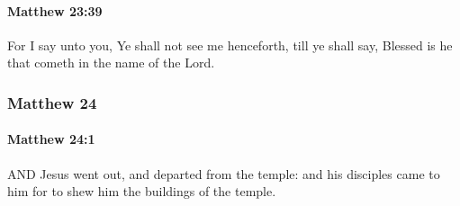 		\paragraph{Matthew 23:39} %
			\label{MATTHEW-23-39}

			For I say unto you, Ye shall not see me henceforth, till ye shall say, Blessed is he that cometh in the name of the Lord.

			\begin{framed}
			\scriptsize
				\begin{compactdesc}
					\item[SBLG] 
				\end{compactdesc}
			\end{framed}

	\subsubsection{Matthew 24} %
		\label{MATTHEW-24}
		
		\paragraph{Matthew 24:1} %
			\label{MATTHEW-24-1}

			AND Jesus went out, and departed from the temple: and his disciples came to him for to shew him the buildings of the temple.

